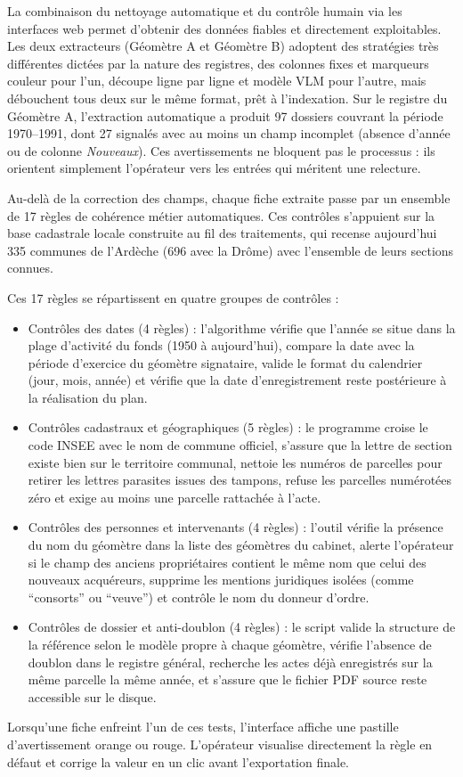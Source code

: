 La combinaison du nettoyage automatique et du contrôle humain via les interfaces web permet d'obtenir des données fiables et directement exploitables. Les deux extracteurs (Géomètre A et Géomètre B) adoptent des stratégies très différentes dictées par la nature des registres, des colonnes fixes et marqueurs couleur pour l'un, découpe ligne par ligne et modèle VLM pour l'autre, mais débouchent tous deux sur le même format, prêt à l'indexation. Sur le registre du Géomètre A, l'extraction automatique a produit 97 dossiers couvrant la période 1970--1991, dont 27 signalés avec au moins un champ incomplet (absence d'année ou de colonne \textit{Nouveaux}). Ces avertissements ne bloquent pas le processus : ils orientent simplement l'opérateur vers les entrées qui méritent une relecture.

Au-delà de la correction des champs, chaque fiche extraite passe par un ensemble de 17 règles de cohérence métier automatiques. Ces contrôles s'appuient sur la base cadastrale locale construite au fil des traitements, qui recense aujourd'hui 335 communes de l'Ardèche (696 avec la Drôme) avec l'ensemble de leurs sections connues.

Ces 17 règles se répartissent en quatre groupes de contrôles :
\begin{itemize}
  \item Contrôles des dates (4 règles) : l'algorithme vérifie que l'année se situe dans la plage d'activité du fonds (1950 à aujourd'hui), compare la date avec la période d'exercice du géomètre signataire, valide le format du calendrier (jour, mois, année) et vérifie que la date d'enregistrement reste postérieure à la réalisation du plan.
  \item Contrôles cadastraux et géographiques (5 règles) : le programme croise le code INSEE avec le nom de commune officiel, s'assure que la lettre de section existe bien sur le territoire communal, nettoie les numéros de parcelles pour retirer les lettres parasites issues des tampons, refuse les parcelles numérotées zéro et exige au moins une parcelle rattachée à l'acte.
  \item Contrôles des personnes et intervenants (4 règles) : l'outil vérifie la présence du nom du géomètre dans la liste des géomètres du cabinet, alerte l'opérateur si le champ des anciens propriétaires contient le même nom que celui des nouveaux acquéreurs, supprime les mentions juridiques isolées (comme \enquote{consorts} ou \enquote{veuve}) et contrôle le nom du donneur d'ordre.
  \item Contrôles de dossier et anti-doublon (4 règles) : le script valide la structure de la référence selon le modèle propre à chaque géomètre, vérifie l'absence de doublon dans le registre général, recherche les actes déjà enregistrés sur la même parcelle la même année, et s'assure que le fichier PDF source reste accessible sur le disque.
\end{itemize}
Lorsqu'une fiche enfreint l'un de ces tests, l'interface affiche une pastille d'avertissement orange ou rouge. L'opérateur visualise directement la règle en défaut et corrige la valeur en un clic avant l'exportation finale. 

